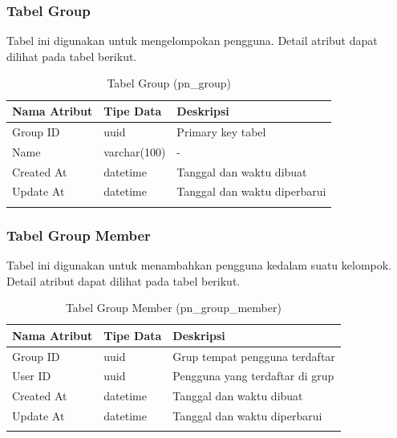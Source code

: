 \subsubsection{Tabel Group}
\par Tabel ini digunakan untuk mengelompokan pengguna. Detail atribut dapat dilihat pada tabel berikut.
\begin{longtable}{|p{2.5cm}|p{2cm}|p{4.5cm}|}
    \hline
    \textbf{Nama Atribut} & \textbf{Tipe Data} & \textbf{Deskripsi} \\ \hline
    Group ID & uuid & Primary key tabel \\ \hline
    Name & varchar(100) & - \\ \hline
    Created At & datetime & Tanggal dan waktu dibuat \\ \hline
    Update At & datetime & Tanggal dan waktu diperbarui \\ \hline
    \caption{Tabel Group (pn\_group)}
\end{longtable}

\subsubsection{Tabel Group Member}
\par Tabel ini digunakan untuk menambahkan pengguna kedalam suatu kelompok. Detail atribut dapat dilihat pada tabel berikut.
\begin{longtable}{|p{2.5cm}|p{2cm}|p{4.5cm}|}
    \hline
    \textbf{Nama Atribut} & \textbf{Tipe Data} & \textbf{Deskripsi} \\ \hline
    Group ID & uuid & Grup tempat pengguna terdaftar \\ \hline
    User ID & uuid & Pengguna yang terdaftar di grup \\ \hline
    Created At & datetime & Tanggal dan waktu dibuat \\ \hline
    Update At & datetime & Tanggal dan waktu diperbarui \\ \hline
    \caption{Tabel Group Member (pn\_group\_member)}
\end{longtable}


